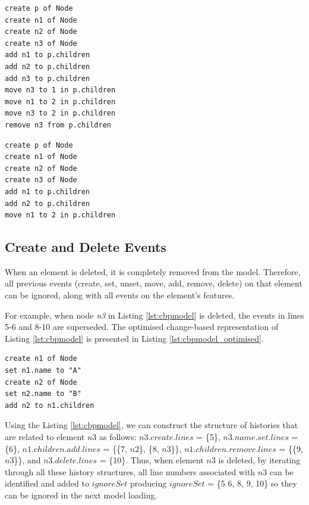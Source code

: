 \documentclass{llncs}
\begin{document}
\noindent
    \begin{minipage}[t]{0.48\linewidth}
\begin{lstlisting}[style=eol,caption={A CBP representation of add, move, and remove operations.},label=lst:add_remove_move_reference]
create p of Node
create n1 of Node
create n2 of Node
create n3 of Node
add n1 to p.children
add n2 to p.children
add n3 to p.children
move n3 to 1 in p.children  
move n1 to 2 in p.children  
move n3 to 2 in p.children
remove n3 from p.children   
\end{lstlisting}
    \end{minipage}
    \hfill
    \begin{minipage}[t]{0.48\linewidth}
\begin{lstlisting}[style=eol,caption={The optimised CBP representation of Listing \ref{lst:add_remove_move_reference}},label=lst:optimised_add_remove_move_reference]
create p of Node
create n1 of Node
create n2 of Node
create n3 of Node
add n1 to p.children
add n2 to p.children  
move n1 to 2 in p.children
\end{lstlisting}
    \end{minipage}
    
    
    \subsection{Create and Delete Events}
    \label{subsec:create_and_delete_operations}
    
    When an element is deleted, it is completely removed from the model. Therefore, all previous events (create, set, unset, move, add, remove, delete) on that element can be ignored, along with all events on the element's features. 
    
    For example, when node \emph{n3} in Listing \ref{lst:cbpmodel} is deleted, the events in lines 5-6 and 8-10 are superseded. The optimised change-based representation of Listing \ref{lst:cbpmodel} is presented in Listing \ref{lst:cbpmodel_optimised}.
    
    \begin{lstlisting}[style=eol,caption={Change-based representation of the model in Fig. \ref{fig:initial_model} after removal of node \emph{n3}.},label=lst:cbpmodel_optimised]
create n1 of Node
set n1.name to "A"
create n2 of Node
set n2.name to "B"
add n2 to n1.children
    \end{lstlisting}
    
    Using the Listing \ref{lst:cbpmodel}, we can construct the structure of histories that are related to element $n3$ as follows: $n3$.$create$.$lines$ = \{5\}, $n3$.$name$.$set$.$lines$ = \{6\}, $n1$.$children$.$add$.$lines$ = \{\{7, $n2$\}, \{8, $n3$\}\}, $n1$.$children$.$remove$.$lines$ = \{\{9, $n3$\}\}, and $n3$.$delete$.$lines$ = \{10\}. Thus, when element $n3$ is deleted, by iterating through all these history structures, all line numbers associated with $n3$ can be identified and added to $ignoreSet$ producing $ignoreSet$ = \{5 6, 8, 9, 10\} so they can be ignored in the next model loading.
    
\end{document}
